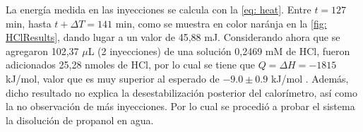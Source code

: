 	La energ\'ia medida en las inyecciones se calcula con la \autoref{eq: heat}. Entre $t = 127$ min, hasta $t + \Delta T=141$ min, como se muestra en color nar\'anja en la \autoref{fig: HClResults}, dando lugar a un valor de 45,88 mJ. Considerando ahora que se agregaron 102,37 $\mu$L (2 inyecciones) de una soluci\'on 0,2469 mM de HCl, fueron adicionados 25,28 nmoles de HCl, por lo cual se tiene que $Q = \Delta H = -1815$ kJ/mol, valor que es muy superior al esperado de $-9.0 \pm 0.9$ kJ/mol \cite{nanoitc}. Adem\'as, dicho resultado no explica la desestabilizaci\'on posterior del calor\'imetro, as\'i como la no observaci\'on de m\'as inyecciones. Por lo cual se procedi\'o a probar el sistema la disoluci\'on de propanol en agua.
	
